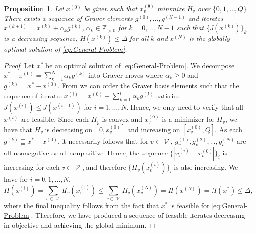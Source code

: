 \documentclass[pdflatex,sn-mathphys-num]{sn-jnl}%
\newtheorem{prop}[theorem]{Proposition}
\newcommand{\Z}{\mathbb{Z}} %
\DeclareMathOperator{\Vcal}{\mathcal{V}}
\begin{document}
\begin{prop}\label{prop:minimal-budget}
    Let $x^{(0)}$ be given such that $x^{(0)}_v$ minimize $H_v$ over $\{0,1,\ldots,Q\}$
    There exists a sequence of Graver elements $g^{(0)},\ldots,g^{(N-1)}$ and iterates $x^{(k+1)} = x^{(k)} + \alpha_kg^{(k)}$, $\alpha_k \in \Z_{> 0}$ for $k=0,\ldots,N-1$ such that $\{J(x^{(k)})\}_k$ is a decreasing sequence, $H(x^{(k)}) \le \Delta$ for all $k$ and $x^{(N)}$ is the globally optimal solution of \eqref{eq:General-Problem}.
\end{prop} 
\begin{proof}
    Let $x^*$ be an optimal solution of \eqref{eq:General-Problem}. 
    We decompose $x^* - x^{(0)} = \sum_{k=1}^{N}\alpha_k g^{(k)}$ into Graver moves where $\alpha_k \ge 0$ and $g^{(k)} \sqsubseteq x^* - x^{(0)}$. 
    From \cite{de2012algebraic} we can order the Graver basis elements such that the sequence of iterates $x^{(i)} = x^{(0)} + \sum_{k=1}^i\alpha_k g^{(k)}$ satisfies $J(x^{(i)}) \le J(x^{(i-1)})$ for $i=1,\ldots,N$. Hence, we only need to verify that all $x^{(i)}$ are feasible. Since each $H_v$ is convex and $x^{(0)}_v$ is a minimizer for $H_v$, we have that $H_v$ is decreasing on $[0, x^{(0)}_v]$ and increasing on $[x^{(0)}_v, Q]$. As each $g^{(k)} \sqsubseteq x^* - x^{(0)}$, it necessarily follows that for $v \in \Vcal$, $g^{(1)}_v, g^{(2)}_v, \ldots, g^{(N)}_v$ are all nonnegative or all nonpositive. Hence, the sequence $\{|x^{(i)}_v - x^{(0)}_v|\}_{i}$ is increasing for each $v \in \Vcal$, and therefore $\{H_v(x^{(i)}_v)\}_i$ is also increasing. We have for $i=0,1,\ldots,N$,
    \begin{equation}
        H(x^{(i)}) = \sum_{v \in \Vcal}H_v(x^{(i)}_v) \le \sum_{v\in \Vcal}H_v(x^{(N)}_v) = H(x^{(N)}) = H(x^*) \le \Delta ,
    \end{equation}
    where the final inequality follows from the fact that $x^*$ is feasible for \eqref{eq:General-Problem}. Therefore, we have produced a sequence of feasible iterates decreasing in objective and achieving the global minimum.
\end{proof}

\end{document}
